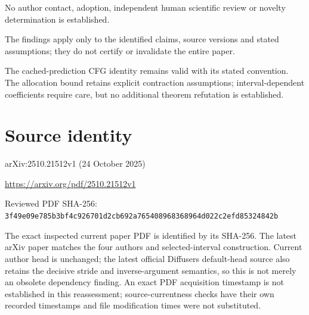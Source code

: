 \documentclass[11pt]{article}
\begin{document}
No author contact, adoption, independent human scientific review or novelty determination is established.\par

The findings apply only to the identified claims, source versions and stated assumptions; they do not certify or invalidate the entire paper.\par

The cached-prediction CFG identity remains valid with its stated convention. The allocation bound retains explicit contraction assumptions; interval-dependent coefficients require care, but no additional theorem refutation is established.\par

\section*{Source identity}

arXiv:2510.21512v1 (24 October 2025)

\url{https://arxiv.org/pdf/2510.21512v1}

Reviewed PDF SHA-256: \nolinkurl{3f49e09e785b3bf4c926701d2cb692a765408968368964d022c2efd85324842b}

The exact inspected current paper PDF is identified by its SHA-256. The latest arXiv paper matches the four authors and selected-interval construction. Current author head is unchanged; the latest official Diffusers default-head source also retains the decisive stride and inverse-argument semantics, so this is not merely an obsolete dependency finding. An exact PDF acquisition timestamp is not established in this reassessment; source-currentness checks have their own recorded timestamps and file modification times were not substituted.
\end{document}
